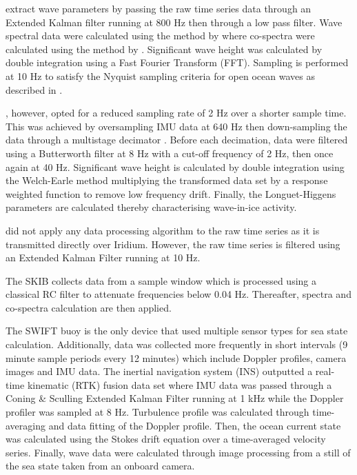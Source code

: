 \textcite{rabault2019open} extract wave parameters by passing the raw time series data through an Extended Kalman filter running at 800 Hz then through a low pass filter. Wave spectral data were calculated using the method by \textcite{earle1996nondirectional} where co-spectra were calculated using the method by \textcite{kuik1988method}. Significant wave height was calculated by double integration using a Fast Fourier Transform (FFT). Sampling is performed at 10 Hz to satisfy the Nyquist sampling criteria for open ocean waves as described in \cite{rabault2019open,earle1996nondirectional}.

\textcite{kohout2015device}, however, opted for a reduced sampling rate of 2 Hz over a shorter sample time. This was achieved by oversampling IMU data at 640 Hz then down-sampling the data through a multistage decimator \cite{kohout2015device}. Before each decimation, data were filtered using a Butterworth filter at 8 Hz with a cut-off frequency of 2 Hz, then once again at 40 Hz. Significant wave height is calculated by double integration using the Welch-Earle method \cite{earle1996nondirectional,welch1967use} multiplying the transformed data set by a response weighted function to remove low frequency drift. Finally, the Longuet-Higgens parameters are calculated thereby characterising wave-in-ice activity.

\textcite{doble2017robust} did not apply any data processing algorithm to the raw time series as it is transmitted directly over Iridium. However, the raw time series is filtered using an Extended Kalman Filter running at 10 Hz.

The SKIB collects data from a sample window which is processed using a classical RC filter to attenuate frequencies below 0.04 Hz. Thereafter, \textcite{earle1996nondirectional} spectra and co-spectra calculation are then applied.

The SWIFT buoy is the only device that used multiple sensor types for sea state calculation. Additionally, data was collected more frequently in short intervals (9 minute sample periods every 12 minutes) which include Doppler profiles, camera images and IMU data. The inertial navigation system (INS) outputted a real-time kinematic (RTK) fusion data set where IMU data was passed through a Coning \& Sculling Extended Kalman Filter running at 1 kHz \cite{thomson2012wave} while the Doppler profiler was sampled at 8 Hz. Turbulence profile was calculated through time-averaging and data fitting of the Doppler profile. Then, the ocean current state was calculated using the Stokes drift equation over a time-averaged velocity series. Finally, wave data were calculated  through image processing from a still of the sea state taken from an onboard camera.

